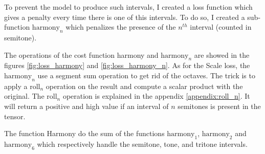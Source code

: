 \documentclass[12pt]{report}
\begin{document}
To prevent the model to produce such intervals, I created a loss function which gives a penalty every time there is one of this intervals.
To do so, I created a sub-function $\text{harmony}_n$ which penalizes the presence of the $n^{th}$ interval (counted in semitone).

The operations of the cost function harmony and $\text{harmony}_n$ are showed in the figures \ref{fig:loss_harmony} and \ref{fig:loss_harmony_n}.
As for the Scale loss, the $\text{harmony}_{n}$ use a segment sum operation to get rid of the octaves.
The trick is to apply a $\text{roll}_{n}$ operation on the result and compute a scalar product with the original.
The $\text{roll}_n$ operation is explained in the appendix \ref{appendix:roll_n}.
It will return a positive and high value if an interval of $n$ semitones is present in the tensor.

The function Harmony do the sum of the functions $\text{harmony}_1$, $\text{harmony}_{2}$ and $\text{harmony}_{6}$ which respectively handle the semitone, tone, and tritone intervals.
\end{document}
